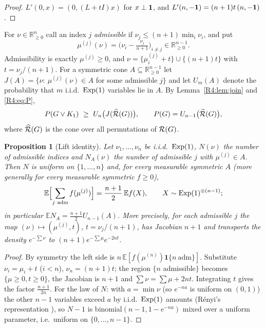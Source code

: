 \documentclass[11pt]{amsart}
\newtheorem{proposition}[theorem]{Proposition}
\theoremstyle{definition}
\theoremstyle{remark}
\providecommand{\R}{\mathbb R}
\begin{document}
\begin{proof}
$L'(0,x)=(0,(L+tI)x)$ for $x\perp\mathbf{1}$, and
$L'(n,-\mathbf{1})=(n+1)t\,(n,-\mathbf{1})$.
\end{proof}

For $\nu\in\R^n_{\ge0}$ call an index $j$ \emph{admissible} if
$\nu_j\le(n+1)\min_i\nu_i$, and put
\[
 \mu^{(j)}(\nu)=\bigl(\nu_i-\tfrac{\nu_j}{n+1}\bigr)_{i\ne j}\in\R^{n-1}_{\ge0}.
\]
Admissibility is exactly $\mu^{(j)}\ge0$, and
$\nu=\{\mu^{(j)}_i+t\}\cup\{(n+1)t\}$ with $t=\nu_j/(n+1)$.  For a symmetric
cone $A\subseteq\R^{n-1}_{\ge0}$ let
$J(A)=\{\nu:\ \mu^{(j)}(\nu)\in A$ for some admissible $j\}$ and let
$U_{m}(A)$ denote the probability that $m$ i.i.d.\ $\operatorname{Exp}(1)$ variables
lie in $A$.  By Lemma~\ref{R4:lem:join} and \eqref{R4:eq:P},
\begin{equation}\label{R4:eq:Jbound}
 P(G\vee K_1)\ \ge\ U_n\bigl(J(\widehat{\mathcal{R}}(G))\bigr),\qquad
 P(G)=U_{n-1}\bigl(\widehat{\mathcal{R}}(G)\bigr),
\end{equation}
where $\widehat{\mathcal{R}}(G)$ is the cone over all permutations of $\mathcal{R}(G)$.

\begin{proposition}[Lift identity]\label{R4:prop:lift}
Let $\nu_1,\dots,\nu_n$ be i.i.d.\ $\operatorname{Exp}(1)$, $N(\nu)$ the number of
admissible indices and $N_A(\nu)$ the number of admissible $j$ with
$\mu^{(j)}\in A$.  Then $N$ is uniform on $\{1,\dots,n\}$ and, for every
measurable symmetric $A$ (more generally for every measurable symmetric
$f\ge0$),
\[
 \mathbb E\Bigl[\sum_{j\ \rm adm}f(\mu^{(j)})\Bigr]=\frac{n+1}{2}\,
 \mathbb E f(X),\qquad X\sim\operatorname{Exp}(1)^{\otimes(n-1)};
\]
in particular $\mathbb E N_A=\tfrac{n+1}2U_{n-1}(A)$.
More precisely, for each admissible $j$ the map
$(\nu)\mapsto(\mu^{(j)},t)$, $t=\nu_j/(n+1)$, has Jacobian $n+1$ and
transports the density $e^{-\sum\nu}$ to
$(n+1)e^{-\sum\mu}e^{-2nt}$.
\end{proposition}

\begin{proof}
By symmetry the left side is $n\,\mathbb E[f(\mu^{(n)})\mathbf
1\{n\ \text{adm}\}]$.  Substitute $\nu_i=\mu_i+t$ ($i<n$),
$\nu_n=(n+1)t$; the region $\{n$ admissible$\}$ becomes
$\{\mu\ge0,t\ge0\}$, the Jacobian is $n+1$ and
$\sum\nu=\sum\mu+2nt$.  Integrating $t$ gives the factor
$\frac{n+1}{2n}$.  For the law of $N$: with $a=\min\nu$ (so $e^{-na}$ is
uniform on $(0,1)$) the other $n-1$ variables exceed $a$ by i.i.d.\
$\operatorname{Exp}(1)$ amounts (R\'enyi's representation \cite{R4-Renyi}), so $N-1$ is
binomial$(n-1,1-e^{-na})$ mixed over a uniform parameter, i.e.\ uniform on
$\{0,\dots,n-1\}$.
\end{proof}
\end{document}
